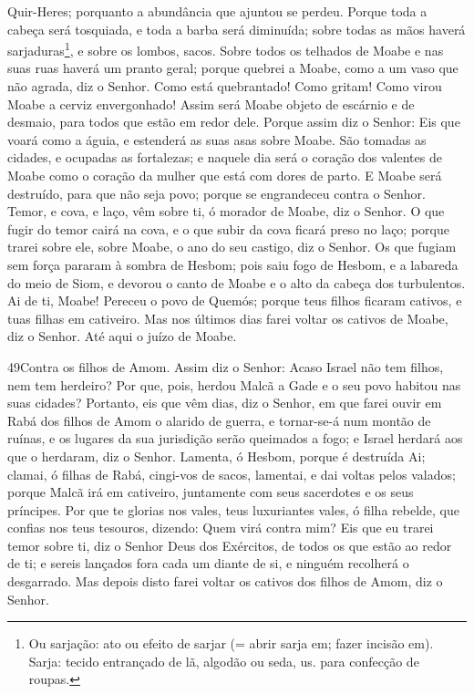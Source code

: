Quir-Heres; porquanto a abundância que ajuntou se perdeu.
Porque toda a cabeça será tosquiada, e toda a barba será
diminuída; sobre todas as mãos haverá sarjaduras\footnote{Ou
sarjação: ato ou efeito de sarjar (= abrir sarja em; fazer incisão
em). Sarja: tecido entrançado de lã, algodão ou seda, us. para
confecção de roupas.}, e sobre os lombos, sacos. Sobre todos
os telhados de Moabe e nas suas ruas haverá um pranto geral; porque
quebrei a Moabe, como a um vaso que não agrada, diz o Senhor.
Como está quebrantado! Como gritam! Como virou Moabe a cerviz
envergonhado! Assim será Moabe objeto de escárnio e de desmaio, para
todos que estão em redor dele. Porque assim diz o Senhor: Eis
que voará como a águia, e estenderá as suas asas sobre Moabe.
São tomadas as cidades, e ocupadas as fortalezas; e naquele
dia será o coração dos valentes de Moabe como o coração da mulher
que está com dores de parto. E Moabe será destruído, para que
não seja povo; porque se engrandeceu contra o Senhor. Temor,
e cova, e laço, vêm sobre ti, ó morador de Moabe, diz o Senhor.
O que fugir do temor cairá na cova, e o que subir da cova
ficará preso no laço; porque trarei sobre ele, sobre Moabe, o ano do
seu castigo, diz o Senhor. Os que fugiam sem força pararam à
sombra de Hesbom; pois saiu fogo de Hesbom, e a labareda do meio de
Siom, e devorou o canto de Moabe e o alto da cabeça dos turbulentos.
Ai de ti, Moabe! Pereceu o povo de Quemós; porque teus filhos
ficaram cativos, e tuas filhas em cativeiro. Mas nos últimos
dias farei voltar os cativos de Moabe, diz o Senhor. Até aqui o
juízo de Moabe.

\medskip

\lettrine{49} Contra os filhos de Amom. Assim diz o Senhor:
Acaso Israel não tem filhos, nem tem herdeiro? Por que, pois, herdou
Malcã a Gade e o seu povo habitou nas suas cidades? Portanto,
eis que vêm dias, diz o Senhor, em que farei ouvir em Rabá dos
filhos de Amom o alarido de guerra, e tornar-se-á num montão de
ruínas, e os lugares da sua jurisdição serão queimados a fogo; e
Israel herdará aos que o herdaram, diz o Senhor. Lamenta, ó
Hesbom, porque é destruída Ai; clamai, ó filhas de Rabá, cingi-vos
de sacos, lamentai, e dai voltas pelos valados; porque Malcã irá em
cativeiro, juntamente com seus sacerdotes e os seus príncipes.
Por que te glorias nos vales, teus luxuriantes vales, ó filha
rebelde, que confias nos teus tesouros, dizendo: Quem virá contra
mim? Eis que eu trarei temor sobre ti, diz o Senhor Deus dos
Exércitos, de todos os que estão ao redor de ti; e sereis lançados
fora cada um diante de si, e ninguém recolherá o desgarrado. Mas
depois disto farei voltar os cativos dos filhos de Amom, diz o
Senhor.

